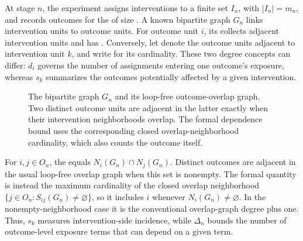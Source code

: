 \documentclass[11pt]{article}
\begin{document}
At stage \(n\), the experiment assigns interventions to a finite set \(I_n\), with \(\lvert I_n\rvert=m_n\), and records outcomes for the  of size . A known bipartite graph \(G_n\) links intervention units to outcome units. For outcome unit \(i\), its  collects adjacent intervention units and has . Conversely, let  denote the outcome units adjacent to intervention unit \(k\), and write  for its cardinality. These two degree concepts can differ: \(d_i\) governs the number of assignments entering one outcome's exposure, whereas \(s_k\) summarizes the outcomes potentially affected by a given intervention.

\begin{figure}[t]
\centering
{}
\caption{The bipartite graph \(G_n\) and its loop-free outcome-overlap graph. Two distinct outcome units are adjacent in the latter exactly when their intervention neighborhoods overlap. The formal dependence bound uses the corresponding closed overlap-neighborhood cardinality, which also counts the outcome itself.}
\end{figure}

For \(i,j\in O_n\), the  equals \(N_i(G_n)\cap N_j(G_n)\). Distinct outcomes are adjacent in the usual loop-free overlap graph when this set is nonempty. The formal quantity  is instead the maximum cardinality of the closed overlap neighborhood \(\{j\in O_n:S_{ij}(G_n)\neq\varnothing\}\), so it includes \(i\) whenever \(N_i(G_n)\neq\varnothing\). In the nonempty-neighborhood case it is the conventional overlap-graph degree plus one. Thus, \(s_k\) measures intervention-side incidence, while \(\Delta_n\) bounds the number of outcome-level exposure terms that can depend on a given term.
\end{document}
